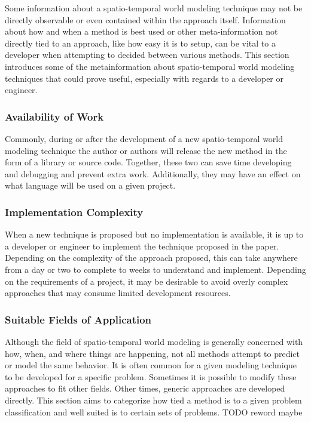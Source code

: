   Some information about a spatio-temporal world modeling technique may not be
  directly observable or even contained within the approach itself. Information
  about how and when a method is best used or other meta-information not directly
  tied to an approach, like how easy it is to setup, can be vital to a developer
  when attempting to decided between various methods. This section introduces
  some of the metainformation about spatio-temporal world modeling techniques
  that could prove useful, especially with regards to a developer or engineer.

  \subsubsection{ Availability of Work }
  Commonly, during or after the development of a new spatio-temporal world
  modeling technique the author or authors will release the new method in the
  form of a library or source code. Together, these two can save time developing
  and debugging and prevent extra work. Additionally, they may have an effect
  on what language will be used on a given project.

  \subsubsection{ Implementation Complexity }
  When a new technique is proposed but no implementation is available, it is
  up to a developer or engineer to implement the technique proposed in the paper.
  Depending on the complexity of the approach proposed, this can take anywhere
  from a day or two to complete to weeks to understand and implement. Depending
  on the requirements of a project, it may be desirable to avoid overly complex
  approaches that may consume limited development resources.

  \subsubsection{ Suitable Fields of Application }
  Although the field of spatio-temporal world modeling is generally concerned
  with how, when, and where things are happening, not all methods attempt to
  predict or model the same behavior. It is often common for a given modeling
  technique to be developed for a specific problem. Sometimes it is possible to
  modify these approaches to fit other fields. Other times, generic
  approaches are developed directly. This section aims to categorize how tied
  a method is to a given problem classification and well suited is to certain
  sets of problems. TODO reword maybe


